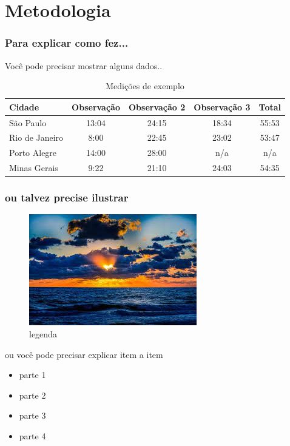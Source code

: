 \documentclass{beamer} %
\begin{document}
\section{Metodologia}
\begin{frame}
\frametitle{Para explicar como fez...}
Você pode precisar mostrar alguns dados..
\begin{table}
\begin{tabular}{l | c | c | c | c } 
Cidade & Observação & Observação 2 & Observação 3 & Total \\
\hline \hline
São Paulo & 13:04 & 24:15 & 18:34 & 55:53 \\ 
Rio de Janeiro & 8:00 & 22:45 & 23:02 & 53:47\\
Porto Alegre & 14:00 & 28:00 & n/a & n/a\\
Minas Gerais & 9:22 & 21:10 & 24:03 & 54:35 
\end{tabular}
\caption{Medições de exemplo}
\end{table}
\end{frame}

\begin{frame}
\frametitle{ou talvez precise ilustrar}
\begin{figure}
\includegraphics[scale=0.5]{exemplo.jpg}
\caption{legenda}
\end{figure}

\end{frame}





\begin{frame}{ou você pode precisar explicar item a item}
\begin{itemize}
\item<+-> parte 1
\item<+-> parte 2
\item<+-> parte 3
\item<+-> parte 4
\end{itemize}
\end{frame}
\end{document}
